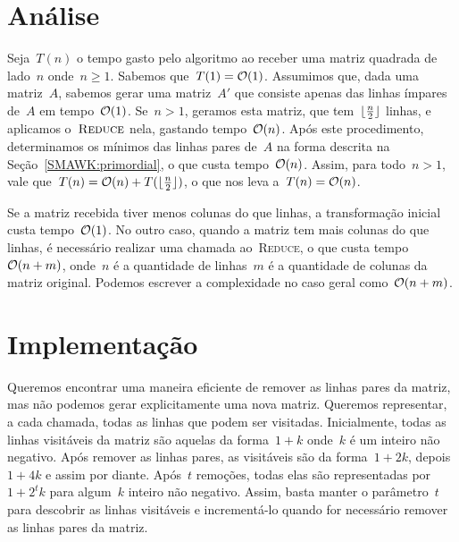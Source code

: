\section{Análise}
Seja~$T(n)$ o tempo gasto pelo algoritmo ao receber uma matriz quadrada de lado~$n$ onde~$n \geq 1$. Sabemos que~$T(1) = \mathcal{O}(1)$. Assumimos que, dada uma matriz~$A$, sabemos gerar uma matriz~$A'$ que consiste apenas das linhas ímpares de~$A$ em tempo~$\mathcal{O}(1)$. Se~$n > 1$, geramos esta matriz, que tem~$\lfloor\frac{n}{2}\rfloor$ linhas, e aplicamos o~$\textsc{Reduce}$ nela, gastando tempo~$\mathcal{O}(n)$. Após este procedimento, determinamos os mínimos das linhas pares de~$A$ na forma descrita na Seção~\ref{SMAWK:primordial}, o que custa tempo~$\mathcal{O}(n)$. Assim, para todo~${ n > 1 }$, vale que~${ T(n) = \mathcal{O}(n) + T(\lfloor\frac{n}{2}\rfloor) }$, o que nos leva a~${ T(n) = \mathcal{O}(n) }$.

Se a matriz recebida tiver menos colunas do que linhas, a transformação inicial custa tempo~$\mathcal{O}(1)$. No outro caso, quando a matriz tem mais colunas do que linhas, é necessário realizar uma chamada ao~\textsc{Reduce}, o que custa tempo~$\mathcal{O}(n+m)$, onde~$n$ é a quantidade de linhas~$m$ é a quantidade de colunas da matriz original. Podemos escrever a complexidade no caso geral como~$\mathcal{O}(n+m)$.


\section{Implementação}
Queremos encontrar uma maneira eficiente de remover as linhas pares da matriz, mas não podemos gerar explicitamente uma nova matriz. Queremos representar, a cada chamada, todas as linhas que podem ser visitadas. Inicialmente, todas as linhas visitáveis da matriz são aquelas da forma~${ 1 + k }$ onde~$k$ é um inteiro não negativo. Após remover as linhas pares, as visitáveis são da forma~${ 1 + 2k }$, depois~${ 1 + 4k }$ e assim por diante. Após~$t$ remoções, todas elas são representadas por~${ 1 + 2^tk }$ para algum~$k$ inteiro não negativo. Assim, basta manter o parâmetro~$t$ para descobrir as linhas visitáveis e incrementá-lo quando for necessário remover as linhas pares da matriz.


